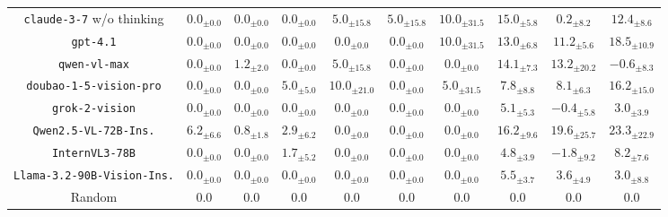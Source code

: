 \begin{table}[t]
\begin{tabular}{cccccccccc}
\texttt{claude-3-7} w/o thinking & $0.0_{\pm0.0}$ & $0.0_{\pm0.0}$ & $0.0_{\pm0.0}$ & $5.0_{\pm15.8}$ & $5.0_{\pm15.8}$ & $10.0_{\pm31.5}$ & $15.0_{\pm5.8}$ & $0.2_{\pm8.2}$ & $12.4_{\pm8.6}$ \\
\texttt{gpt-4.1} & $0.0_{\pm0.0}$ & $0.0_{\pm0.0}$ & $0.0_{\pm0.0}$ & $0.0_{\pm0.0}$ & $0.0_{\pm0.0}$ & $10.0_{\pm31.5}$ & $13.0_{\pm6.8}$ & $11.2_{\pm5.6}$ & $18.5_{\pm10.9}$  \\
\texttt{qwen-vl-max} & $0.0_{\pm0.0}$ & $1.2_{\pm2.0}$ & $0.0_{\pm0.0}$ & $5.0_{\pm15.8}$ & $0.0_{\pm0.0}$ & $0.0_{\pm0.0}$ & $14.1_{\pm7.3}$ & $13.2_{\pm20.2}$ & $-0.6_{\pm8.3}$  \\
\texttt{doubao-1-5-vision-pro} & $0.0_{\pm0.0}$ & $0.0_{\pm0.0}$ & $5.0_{\pm5.0}$ & $10.0_{\pm21.0}$ & $0.0_{\pm0.0}$ & $5.0_{\pm31.5}$ & $7.8_{\pm8.8}$ & $8.1_{\pm6.3}$ & $16.2_{\pm15.0}$  \\
\texttt{grok-2-vision} & $0.0_{\pm0.0}$ & $0.0_{\pm0.0}$ & $0.0_{\pm0.0}$ & $0.0_{\pm0.0}$ & $0.0_{\pm0.0}$ & $0.0_{\pm0.0}$ & $5.1_{\pm5.3}$ & $-0.4_{\pm5.8}$ & $3.0_{\pm3.9}$ \\
\midrule
\texttt{Qwen2.5-VL-72B-Ins.} & $6.2_{\pm6.6}$ & $0.8_{\pm1.8}$ & $2.9_{\pm6.2}$ & $0.0_{\pm0.0}$ & $0.0_{\pm0.0}$ & $0.0_{\pm0.0}$ & $16.2_{\pm9.6}$ & $19.6_{\pm25.7}$ & $23.3_{\pm22.9}$  \\
\texttt{InternVL3-78B} & $0.0_{\pm0.0}$ & $0.0_{\pm0.0}$ & $1.7_{\pm5.2}$ & $0.0_{\pm0.0}$ & $0.0_{\pm0.0}$ & $0.0_{\pm0.0}$ & {$4.8_{\pm3.9}$} & $-1.8_{\pm9.2}$ & $8.2_{\pm7.6}$  \\
\texttt{Llama-3.2-90B-Vision-Ins.} & $0.0_{\pm0.0}$ & $0.0_{\pm0.0}$ & $0.0_{\pm0.0}$ & $0.0_{\pm0.0}$ & $0.0_{\pm0.0}$ & $0.0_{\pm0.0}$ & $5.5_{\pm3.7}$ & $3.6_{\pm4.9}$ & $3.0_{\pm8.8}$  \\
\midrule
Random & $0.0$ & $0.0$ & $0.0$ & $0.0$ & $0.0$ & $0.0$ & $0.0$ & $0.0$ & $0.0$  \\
\bottomrule
\end{tabular}
\setlength{\tabcolsep}{6pt}
\end{table}

